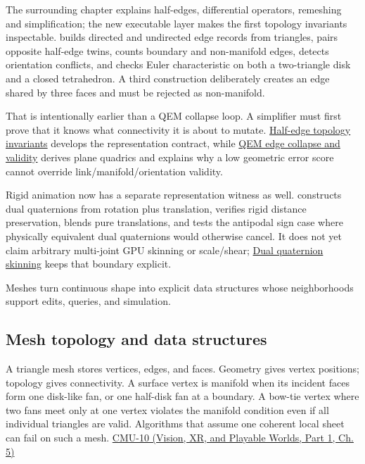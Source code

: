 The surrounding chapter explains half-edges, differential operators, remeshing and simplification; the new executable layer makes the first topology invariants inspectable.  builds directed and undirected edge records from triangles, pairs opposite half-edge twins, counts boundary and non-manifold edges, detects orientation conflicts, and checks Euler characteristic on both a two-triangle disk and a closed tetrahedron. A third construction deliberately creates an edge shared by three faces and must be rejected as non-manifold.

That is intentionally earlier than a QEM collapse loop. A simplifier must first prove that it knows what connectivity it is about to mutate. \hyperref[appendix-faac749c9cdd]{Half-edge topology invariants} develops the representation contract, while \hyperref[appendix-89db9fe1bc8a]{QEM edge collapse and validity} derives plane quadrics and explains why a low geometric error score cannot override link/manifold/orientation validity.

Rigid animation now has a separate representation witness as well.  constructs dual quaternions from rotation plus translation, verifies rigid distance preservation, blends pure translations, and tests the antipodal sign case where physically equivalent dual quaternions would otherwise cancel. It does not yet claim arbitrary multi-joint GPU skinning or scale/shear; \hyperref[appendix-921f3f2efb53]{Dual quaternion skinning} keeps that boundary explicit.

Meshes turn continuous shape into explicit data structures whose neighborhoods support edits, queries, and simulation.

\subsection{Mesh topology and data structures}\label{03-visual-computing-i-ch002-mesh-topology-and-data-structures}

\hypertarget{03-visual-computing-i-ch002-mesh-topology-and-data-structures}{}

A triangle mesh stores vertices, edges, and faces. Geometry gives vertex positions; topology gives connectivity. A surface vertex is manifold when its incident faces form one disk-like fan, or one half-disk fan at a boundary. A bow-tie vertex where two fans meet only at one vertex violates the manifold condition even if all individual triangles are valid. Algorithms that assume one coherent local sheet can fail on such a mesh. \href{../07-Vision-XR-and-Playable-Worlds-P01/main.pdf\#nameddest=04-visual-computing-ii-ch036-cmu-10---meshes-and-manifolds}{CMU-10 (Vision, XR, and Playable Worlds, Part 1, Ch. 5)}

